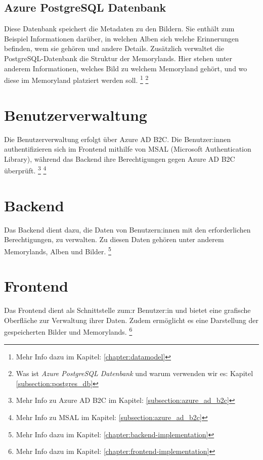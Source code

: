 \subsection{Azure PostgreSQL Datenbank}

Diese Datenbank speichert die Metadaten zu den Bildern. 
Sie enthält zum Beispiel Informationen darüber, in welchen Alben sich welche Erinnerungen befinden,
wem sie gehören und andere Details. Zusätzlich verwaltet die PostgreSQL-Datenbank die 
Struktur der Memorylands. Hier stehen unter anderem Informationen, welches Bild zu welchem 
Memoryland gehört, und wo diese im Memoryland platziert werden soll.
\footnote{Mehr Info dazu im Kapitel: \ref{chapter:datamodel}}
\footnote{Was ist \emph{Azure PostgreSQL Datenbank} und warum verwenden wir es: Kapitel \ref{subsection:postgres_db}}

\section{Benutzerverwaltung}

Die Benutzerverwaltung erfolgt über Azure AD B2C. Die Benutzer:innen authentifizieren sich 
im Frontend mithilfe von MSAL (Microsoft Authentication Library), während das Backend 
ihre Berechtigungen gegen Azure AD B2C überprüft.
\footnote{Mehr Info zu Azure AD B2C im Kapitel: \ref{subsection:azure_ad_b2c}}
\footnote{Mehr Info zu MSAL im Kapitel: \ref{subsection:azure_ad_b2c}}

\section{Backend}

Das Backend dient dazu, die Daten von Benutzern:innen mit den erforderlichen
Berechtigungen, zu verwalten. Zu diesen Daten gehören unter anderem Memorylands, 
Alben und Bilder. \footnote{Mehr Info dazu im Kapitel: \ref{chapter:backend-implementation}}

\section{Frontend}

Das Frontend dient als Schnittstelle zum:r Benutzer:in und bietet eine grafische 
Oberfläche zur Verwaltung ihrer Daten. Zudem ermöglicht es eine Darstellung 
der gespeicherten Bilder und Memorylands.
\footnote{Mehr Info dazu im Kapitel: \ref{chapter:frontend-implementation}}

